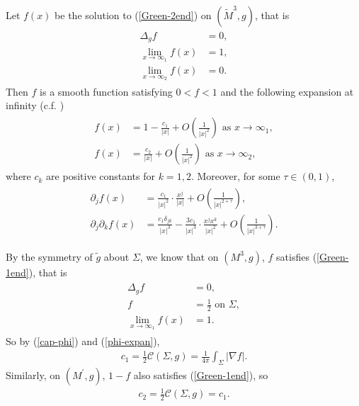 \documentclass[letter]{amsart}
\theoremstyle{definition}
\theoremstyle{remark}
\begin{document}
Let $f(x)$ be the solution to (\ref{Green-2end}) on $(\tilde{M}^3, g)$, that is
\begin{align}\label{har-eq}
	\begin{split}
	\Delta_{g} f &=0,\\
	\lim_{x \to \infty_1} f(x) &= 1,\\
	\lim_{x\to \infty_2} f(x) &= 0.
\end{split}
\end{align}
Then $f$ is a smooth function satisfying $0< f <1$ and the following expansion at infinity (c.f. \cite{Bartnik'86, Bray'01})
\begin{align}\label{f-eq2}
		\begin{split}
		f(x) &= 1 - \frac{c_1}{|x|} + O\left( \frac{1}{|x|^2} \right)  \text{ as } x \to \infty_1, \\
		f(x) &= \frac{c_2}{|x|} + O\left( \frac{1}{|x|^2} \right)  \text{ as } x\to \infty_2,
	\end{split}
	\end{align}
	where $c_k$ are positive constants for $k= 1, 2$. Moreover, for some $\tau \in (0,1)$,
	\begin{align}\label{f-eq3}
		\begin{split}
			\partial _j f(x) & = \frac{c_1}{|x|^2}\cdot  \frac{x^j}{|x|} + O\left(\frac{1}{|x|^{2+\tau  }}\right),\\
			\partial _j \partial _k f(x) &= \frac{c_1 \delta _{jk}}{|x|^3} - \frac{3c_1}{|x|^3}\cdot  \frac{x^j x^k}{|x|^2} + O\left( \frac{1}{|x|^{3+\tau  }} \right) .
		\end{split}
	\end{align}

	By the symmetry of $\tilde{g}$ about $\Sigma$, we know that on $(M^3, g)$, $f$ satisfies (\ref{Green-1end}), that is
	\begin{align}\label{f-eq1}
	\begin{split}
		\Delta _g f &=0,\\
		f&= \frac{1}{2} \text{ on } \Sigma,\\
		\lim_{x\to \infty_1} f(x) &=1.
	\end{split}
\end{align}
So by (\ref{cap-phi}) and (\ref{phi-expan}),
\begin{align}\label{cap-f}
c_1 = \frac{1}{2}\mathcal{C}(\Sigma, g) = \frac{1}{4 \pi } \int_{\Sigma}|\nabla f|.
\end{align}
Similarly, on $(M^{\prime}, g)$, $1-f$ also satisfies (\ref{Green-1end}), so 
\begin{align}
	c_2 = \frac{1}{2} \mathcal{C}(\Sigma, g) = c_1.
\end{align}
\end{document}
